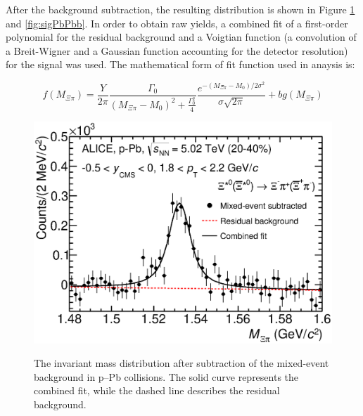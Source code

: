 After the background subtraction, the resulting distribution is shown in Figure \ref{fig:sigpPba} and \ref{fig:sigPbPbb}. In order to obtain raw yields, a combined fit of a first-order polynomial for the residual background and a Voigtian function (a convolution of a Breit-Wigner and a Gaussian function accounting for the detector resolution) for the signal was used. The mathematical form of fit function used in anaysis is: 

\begin{equation}
f(M_{\Xi\pi})= \frac{Y}{2\pi}  \frac{\Gamma_{0}}{(M_{\Xi\pi}-M_{0})^2+\frac{\Gamma_{0}^{2}}{4}} \frac{e^{-(M_{\Xi\pi}-M_{0})/2\sigma^{2}}}{\sigma\sqrt{2\pi}} + bg(M_{\Xi\pi})
\end{equation}


\begin{figure}[htbp]
\begin{center}
\includegraphics[width=12.0cm]{./Version1/FigChapter5/Extraction/SigpPb_After.eps}
\hspace{0.5cm}
\label{fig:sigpPba} 
\caption{ The invariant mass distribution after subtraction of the mixed-event background in p--Pb collisions. 
The solid curve represents the combined fit, while the dashed line describes the residual background.}
\end{center}
\end{figure}


